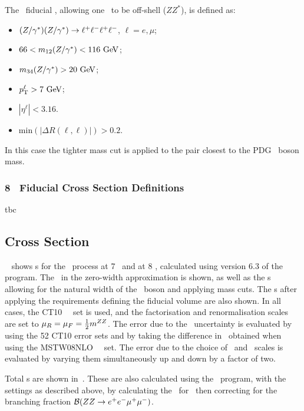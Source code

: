 The \zzllll\ fiducial \cx , allowing one \Z\ to be off-shell ($ZZ^*$), is defined as:

\begin{itemize}
\item $(Z/\gamma^*)(Z/\gamma^*)\rightarrow\ell^+ \ell^-\ell^+ \ell^-$, $\ell = e,\mu$;
\item $66 < m_{12}(\Z/\gamma^*) <  116\GeV$;
\item $m_{34}(\Z/\gamma^*) > 20\GeV$;
\item $\pT^{\ell} > 7\GeV$;
\item $|\eta^{\ell}| < 3.16$.
\item $\mathrm{min}(|\Delta R(\ell,\ell)|) > 0.2$.
\end{itemize}

In this case the tighter mass cut is applied to the pair closest to the PDG \Z\
boson mass.

\subsubsection{8 \tev\ Fiducial Cross Section Definitions}

tbc

\subsection{Cross Section}

~ shows \cx s for the \ZZeemm\ process at 7 \tev\ and
at 8 \tev, calculated using version 6.3 of the
\mcfm~\cite{Campbell:2011} program. The \cx\  in the zero-width approximation is shown, as
well as the \cx s allowing for the natural width of the \Z\ boson and
applying mass cuts.  The \cx s after applying the requirements defining
the fiducial volume are also shown. 
In all cases, the CT10~\cite{CT10} \partDF\ set is used, and the factorisation and renormalisation scales are set
to $\mu_{R} = \mu_{F} = \frac{1}{2} m^{ZZ}$. The error due to the \partDF\ 
uncertainty is
evaluated by using the 52 CT10 error sets and by taking the difference in \cx\ 
obtained when using the MSTW08NLO~\cite{bib:MSTW2008} \partDF\ set. The error 
due to the choice of
\fact\ and \renorm\ scales is evaluated by varying them
simultaneously up and down by a factor of two. 

Total \cx s are shown in~\tab{cx-total-mcfm}. These are also
calculated using the \mcfm\ program, with the settings as described above, by
calculating the \cx\  for \ZZeemm\ then correcting for the branching
fraction $\mathcal{B}(ZZ\rightarrow e^{+}e^{-}\mu^{+}\mu^{-})$. 

